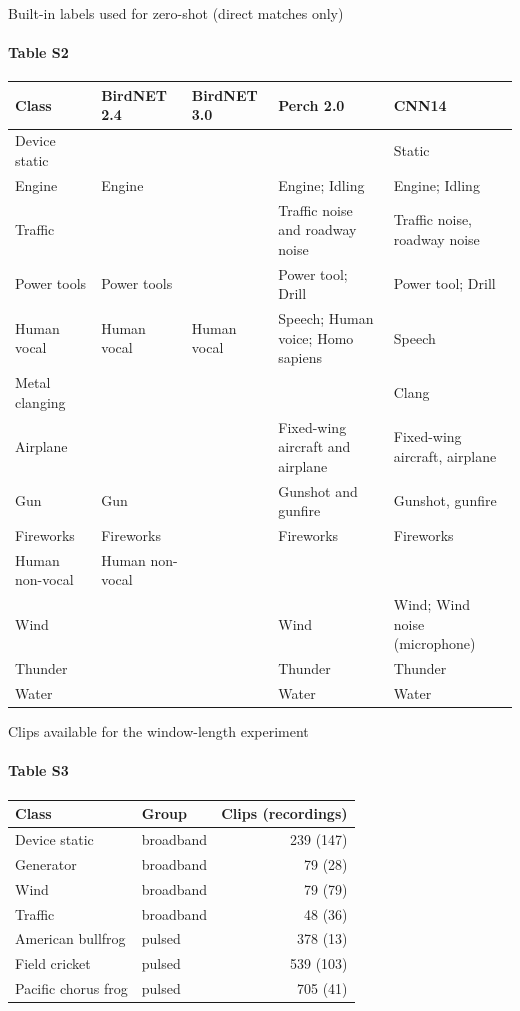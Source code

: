 \documentclass[aspectratio=169,11pt]{beamer}
\begin{document}
\begin{frame}{Built-in labels used for zero-shot (direct matches only)}\framesubtitle{Table S2}
  \centering\scriptsize\setlength{\tabcolsep}{3pt}\renewcommand{\arraystretch}{0.95}
  \begin{tabular}{lllL{3.3cm}L{3.3cm}}
    \toprule
    Class & BirdNET 2.4 & BirdNET 3.0 & Perch 2.0 & CNN14 \\
    \midrule
    Device static & & & & Static \\
    Engine & Engine & & Engine; Idling & Engine; Idling \\
    Traffic & & & Traffic noise and roadway noise & Traffic noise, roadway noise \\
    Power tools & Power tools & & Power tool; Drill & Power tool; Drill \\
    Human vocal & Human vocal & Human vocal & Speech; Human voice; Homo sapiens & Speech \\
    Metal clanging & & & & Clang \\
    Airplane & & & Fixed-wing aircraft and airplane & Fixed-wing aircraft, airplane \\
    Gun & Gun & & Gunshot and gunfire & Gunshot, gunfire \\
    Fireworks & Fireworks & & Fireworks & Fireworks \\
    Human non-vocal & Human non-vocal & & & \\
    Wind & & & Wind & Wind; Wind noise (microphone) \\
    Thunder & & & Thunder & Thunder \\
    Water & & & Water & Water \\
    \bottomrule
  \end{tabular}
\end{frame}

\begin{frame}{Clips available for the window-length experiment}\framesubtitle{Table S3}
  \centering
  \begin{tabular}{llr}
    \toprule
    Class & Group & Clips (recordings) \\
    \midrule
    Device static & broadband & 239 (147) \\
    Generator & broadband & 79 (28) \\
    Wind & broadband & 79 (79) \\
    Traffic & broadband & 48 (36) \\
    American bullfrog & pulsed & 378 (13) \\
    Field cricket & pulsed & 539 (103) \\
    Pacific chorus frog & pulsed & 705 (41) \\
    \bottomrule
  \end{tabular}
\end{frame}
\end{document}

